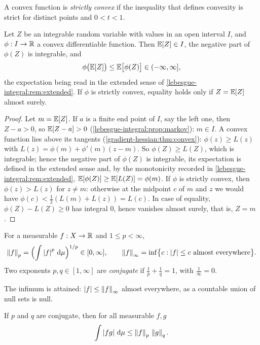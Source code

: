 \begin{notechapter}
A convex function is \emph{strictly convex} if the inequality that
defines convexity is strict for distinct points and $0 < t < 1$.

\begin{theorem}\label{lp-spaces:thm:jensen}
Let $Z$ be an integrable random variable with values in an open interval
$I$, and $\phi:I\to\mathbb{R}$ a convex differentiable function. Then
$\mathbb{E}[Z]\in I$, the negative part of $\phi(Z)$ is integrable, and
\[
  \phi\bigl(\mathbb{E}[Z]\bigr)\leq\mathbb{E}\bigl[\phi(Z)\bigr]\in(-\infty, \infty] ,
\]
the expectation being read in the extended sense of
\cref{lebesgue-integral:rem:extended}.
If $\phi$ is strictly convex, equality holds only if $Z = \mathbb{E}[Z]$ almost
surely.
\end{theorem}

\begin{proof}
Let $m = \mathbb{E}[Z]$. If $a$ is a finite end point of $I$, say the left one,
then $Z - a > 0$, so $\mathbb{E}[Z - a] > 0$
(\cref{lebesgue-integral:prop:markov}): $m\in I$. A convex function lies
above its tangents (\cref{gradient-hessian:thm:convex}):
$\phi(z)\geq L(z)$ with $L(z) = \phi(m) + \phi'(m)(z - m)$. So
$\phi(Z)\geq L(Z)$, which is integrable; hence the negative part of
$\phi(Z)$ is integrable, its expectation is defined in the extended
sense and, by the monotonicity recorded in
\cref{lebesgue-integral:rem:extended},
$\mathbb{E}[\phi(Z)]\geq\mathbb{E}[L(Z)] = \phi(m)$. If $\phi$ is strictly convex, then
$\phi(z) > L(z)$ for $z\neq m$: otherwise at the midpoint $c$ of $m$ and
$z$ we would have $\phi(c) < \frac12(L(m) + L(z)) = L(c)$. In case of
equality, $\phi(Z) - L(Z)\geq0$ has integral $0$, hence vanishes almost
surely, that is, $Z = m$.
\end{proof}

\begin{definition}[$p$-norms]\label{lp-spaces:def:norm}
For a measurable $f:X\to\mathbb{R}$ and $1\leq p < \infty$,
\[
  \left\|f\right\|_p = \Bigl(\int\left|f\right|^p\,\mathrm{d}\mu\Bigr)^{1/p}\in[0, \infty] ,
  \qquad
  \left\|f\right\|_\infty
  = \inf\bigl\{c : \left|f\right|\leq c\text{ almost everywhere}\bigr\} .
\]
Two exponents $p, q\in[1, \infty]$ are \emph{conjugate} if
$\frac1p + \frac1q = 1$, with $\frac1\infty = 0$.
\end{definition}

The infimum is attained: $\left|f\right|\leq\left\|f\right\|_\infty$ almost everywhere, as
a countable union of null sets is null.

\begin{theorem}\label{lp-spaces:thm:holder}
If $p$ and $q$ are conjugate, then for all measurable $f, g$
\[
  \int\left|fg\right|\,\mathrm{d}\mu\leq\left\|f\right\|_p\,\left\|g\right\|_q .
\]
\end{theorem}


\end{notechapter}
